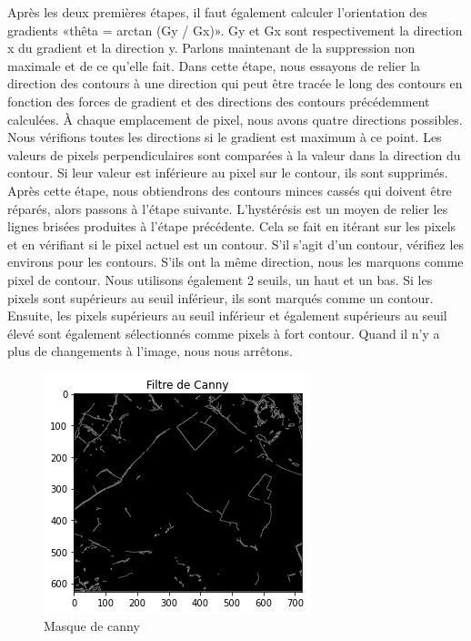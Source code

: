 \documentclass[12pt, openany]{report}
\begin{document}
Après les deux premières étapes, il faut également calculer l'orientation des gradients «thêta = arctan (Gy / Gx)». Gy et Gx sont respectivement la direction x du gradient et la direction y.
Parlons maintenant de la suppression non maximale et de ce qu'elle fait. Dans cette étape, nous essayons de relier la direction des contours à une direction qui peut être tracée le long des contours en fonction des forces de gradient et des directions des contours précédemment calculées. À chaque emplacement de pixel, nous avons quatre directions possibles. Nous vérifions toutes les directions si le gradient est maximum à ce point. Les valeurs de pixels perpendiculaires sont comparées à la valeur dans la direction du contour. Si leur valeur est inférieure au pixel sur le contour, ils sont supprimés. Après cette étape, nous obtiendrons des contours minces cassés qui doivent être réparés, alors passons à l'étape suivante.
L'hystérésis est un moyen de relier les lignes brisées produites à l'étape précédente. Cela se fait en itérant sur les pixels et en vérifiant si le pixel actuel est un contour. S'il s'agit d'un contour, vérifiez les environs pour les contours. S'ils ont la même direction, nous les marquons comme pixel de contour. Nous utilisons également 2 seuils, un haut et un bas. Si les pixels sont supérieurs au seuil inférieur, ils sont marqués comme un contour. Ensuite, les pixels supérieurs au seuil inférieur et également supérieurs au seuil élevé sont également sélectionnés comme pixels à fort contour. Quand il n'y a plus de changements à l'image, nous nous arrêtons.

\begin{figure}[H]
\centering
\includegraphics[scale=0.78]{filtre de canny.png}
\caption{Masque de canny}
\end{figure}
\end{document}
